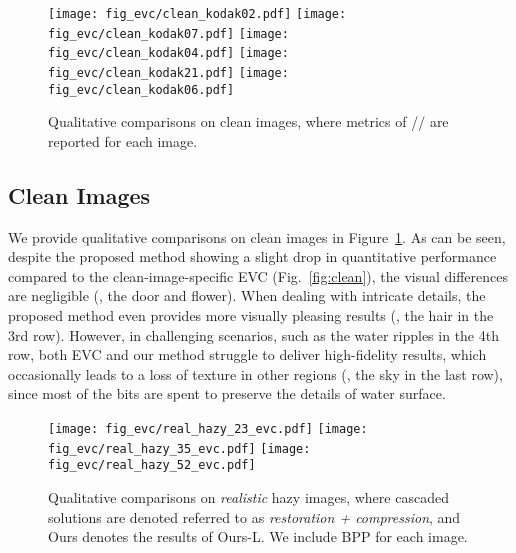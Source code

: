  \begin{figure}[t]
 \centering
\texttt{[image: fig\_evc/clean\_kodak02.pdf]}\vspace{-4pt}
\texttt{[image: fig\_evc/clean\_kodak07.pdf]}\vspace{-4pt}
\texttt{[image: fig\_evc/clean\_kodak04.pdf]}\vspace{-4pt}
\texttt{[image: fig\_evc/clean\_kodak21.pdf]}\vspace{-4pt}
\texttt{[image: fig\_evc/clean\_kodak06.pdf]}\vspace{-0.15in} 
\caption{Qualitative comparisons on clean images, where metrics of // are reported for each image.}  \vspace{-0.05in}
\label{supp_fig:visual_clean}
\end{figure}

\subsection{Clean Images} \label{supp:clean}
We provide qualitative comparisons on clean images in Figure~\ref{supp_fig:visual_clean}.  As can be seen, despite the proposed method showing a slight drop in quantitative performance compared to the clean-image-specific EVC (Fig.~\ref{fig:clean}), the visual differences are negligible (\eg, the door and flower). When dealing with intricate details, the proposed method even provides more visually pleasing results (\eg, the hair in the 3rd row). However, in challenging scenarios, such as the water ripples in the 4th row, both EVC and our method struggle to deliver high-fidelity results, which occasionally leads to a loss of texture in other regions (\eg, the sky in the last row), since most of the bits are spent to preserve the details of water surface.  









 

\begin{figure*}[t]
\centering
\texttt{[image: fig\_evc/real\_hazy\_23\_evc.pdf]}\vspace{-3pt}
\texttt{[image: fig\_evc/real\_hazy\_35\_evc.pdf]}\vspace{-3pt}
\texttt{[image: fig\_evc/real\_hazy\_52\_evc.pdf]}\vspace{-0.15in}
\caption{Qualitative comparisons on \textit{realistic} hazy images, where cascaded solutions are denoted referred to as \textit{restoration + compression}, and Ours denotes the results of Ours-L. We include BPP for each image.
}\vspace{-0.1in}
\label{fig:real_haze}
\end{figure*}

